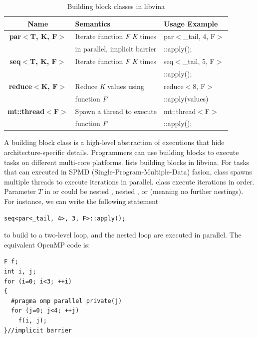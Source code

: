 \begin{table}[hbt]
\caption{Building block classes in libvina}
\begin{tabular}{|c|l|l|}
\hline
Name& Semantics& Usage Example\\
\hline
\textbf{par$<$T, K, F$>$}& Iterate function \textit{F} \textit{K} times &par$<$\_tail, 4, F$>$\\ 
                         &in parallel, implicit barrier                 &::apply();\\                
\hline
\textbf{seq$<$T, K, F$>$}& Iterate function \textit{F} \textit{K} times&seq$<$\_tail, 5, F$>$\\
                         &                                             &::apply();\\
\hline
\textbf{reduce$<$K, F$>$}&Reduce \textit{K} values using &reduce$<$8, F$>$\\
&function
\textit{F}&::apply(values)\\
\hline
\textbf{mt::thread$<$F$>$}&Spawn a thread to execute  & mt::thread$<$F$>$\\
                          &function \textit{F}        & ::apply();\\
\hline
\end{tabular}\label{tbl:bb}
\end{table}

A building block class is a high-level abstraction of executions that
hide architecture-specific details. Programmers can use building blocks to
execute tasks on different multi-core platforms.
 lists building blocks in libvina. For tasks that can
executed in SPMD (Single-Program-Multiple-Data) fasion,  class spawns
multiple threads to execute iterations in parallel.  class 
execute iterations in order. Parameter $T$ in  or  could be nested
, nested , or  (meaning no further nestings).
For instance, we can write the following statement 


\begin{lstlisting}
seq<par<_tail, 4>, 3, F>::apply();
\end{lstlisting}
to build to a two-level loop, and the nested loop are executed in
parallel. The equivalent OpenMP code is:
\begin{lstlisting}
F f;
int i, j;
for (i=0; i<3; ++i)
{
  #pragma omp parallel private(j)
  for (j=0; j<4; ++j) 
    f(i, j);
}//implicit barrier
\end{lstlisting}

